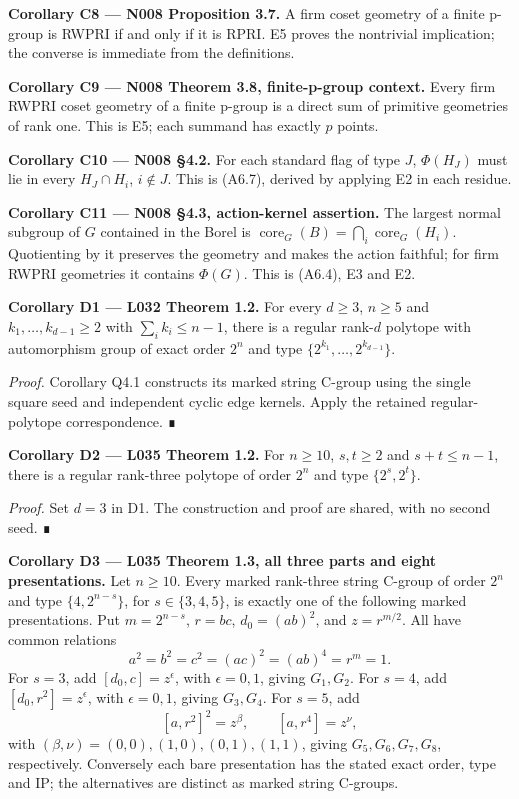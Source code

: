 \documentclass[
  10pt,
  letterpaper,
]{article}
\begin{document}
\textbf{Corollary C8 --- N008 Proposition 3.7.} A firm coset geometry of
a finite p-group is RWPRI if and only if it is RPRI. E5 proves the
nontrivial implication; the converse is immediate from the definitions.

\textbf{Corollary C9 --- N008 Theorem 3.8, finite-p-group context.}
Every firm RWPRI coset geometry of a finite p-group is a direct sum of
primitive geometries of rank one. This is E5; each summand has exactly
\(p\) points.

\textbf{Corollary C10 --- N008 §4.2.} For each standard flag of type
\(J\), \(\Phi(H_J)\) must lie in every \(H_J\cap H_i\), \(i\notin J\).
This is (A6.7), derived by applying E2 in each residue.

\textbf{Corollary C11 --- N008 §4.3, action-kernel assertion.} The
largest normal subgroup of \(G\) contained in the Borel is
\(\operatorname{core}_G(B)=\bigcap_i\operatorname{core}_G(H_i)\).
Quotienting by it preserves the geometry and makes the action faithful;
for firm RWPRI geometries it contains \(\Phi(G)\). This is (A6.4), E3
and E2.

\textbf{Corollary D1 --- L032 Theorem 1.2.} For every \(d\ge3\),
\(n\ge5\) and \(k_1,\ldots,k_{d-1}\ge2\) with \(\sum_i k_i\le n-1\),
there is a regular rank-\(d\) polytope with automorphism group of exact
order \(2^n\) and type \(\{2^{k_1},\ldots,2^{k_{d-1}}\}\).

\emph{Proof.} Corollary Q4.1 constructs its marked string C-group using
the single square seed and independent cyclic edge kernels. Apply the
retained regular-polytope correspondence. ∎

\textbf{Corollary D2 --- L035 Theorem 1.2.} For \(n\ge10\), \(s,t\ge2\)
and \(s+t\le n-1\), there is a regular rank-three polytope of order
\(2^n\) and type \(\{2^s,2^t\}\).

\emph{Proof.} Set \(d=3\) in D1. The construction and proof are shared,
with no second seed. ∎

\textbf{Corollary D3 --- L035 Theorem 1.3, all three parts and eight
presentations.} Let \(n\ge10\). Every marked rank-three string C-group
of order \(2^n\) and type \(\{4,2^{n-s}\}\), for \(s\in\{3,4,5\}\), is
exactly one of the following marked presentations. Put \(m=2^{n-s}\),
\(r=bc\), \(d_0=(ab)^2\), and \(z=r^{m/2}\). All have common relations
\[
a^2=b^2=c^2=(ac)^2=(ab)^4=r^m=1.
\] For \(s=3\), add \([d_0,c]=z^\epsilon\), with \(\epsilon=0,1\),
giving \(G_1,G_2\). For \(s=4\), add \([d_0,r^2]=z^\epsilon\), with
\(\epsilon=0,1\), giving \(G_3,G_4\). For \(s=5\), add \[
[a,r^2]^2=z^\beta,\qquad [a,r^4]=z^\nu,
\] with \((\beta,\nu)=(0,0),(1,0),(0,1),(1,1)\), giving
\(G_5,G_6,G_7,G_8\), respectively. Conversely each bare presentation has
the stated exact order, type and IP; the alternatives are distinct as
marked string C-groups.
\end{document}
